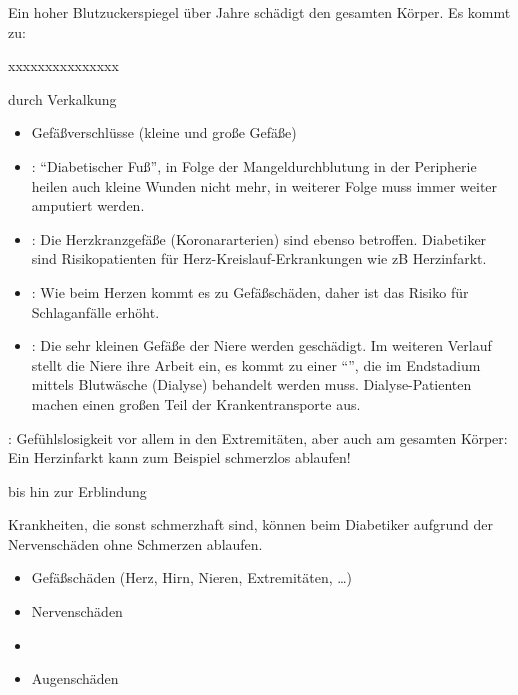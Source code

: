 {
Ein hoher Blutzuckerspiegel über Jahre schädigt den gesamten
Körper. Es kommt zu:
\begin{labeling}[~--]{xxxxxxxxxxxxxxx }
  \item[Gefäßschäden] durch Verkalkung
  \begin{itemize}
    \item Gefäßverschlüsse (kleine und große Gefäße)
    \item {}: "`Diabetischer
    Fuß"', in Folge der Mangeldurchblutung in der Peripherie heilen auch kleine
    Wunden nicht mehr, in weiterer Folge muss immer weiter amputiert
    werden.
    \item {}: Die Herzkranzgefäße
    (Koronar\-arterien) sind ebenso betroffen. Diabetiker sind Risikopatienten für
    Herz-Kreislauf-Erkrankungen wie zB Herz\-infarkt.
    \item {}: Wie beim Herzen kommt es zu
    Gefäßschäden, daher ist das Risiko für
    Schlaganfälle erhöht.
    \item {}: Die sehr kleinen Gefäße der
    Niere werden geschädigt. Im weiteren Verlauf stellt die Niere ihre
    Arbeit ein, es kommt zu einer "`"', die im Endstadium mittels
    Blutwäsche (Dialyse) behandelt werden muss. Dialyse-Patienten machen
    einen großen Teil der Krankentransporte aus.
  \end{itemize}
  \item [Nervenschäden] :
  Gefühlslosigkeit vor allem in den Extremitäten, aber auch am
  gesamten Körper: Ein Herzinfarkt kann zum Beispiel schmerzlos
  ablaufen!
  \item [Augenschäden] bis hin zur Erblindung
  
\end{labeling}

Krankheiten, die sonst schmerzhaft sind, können beim Diabetiker aufgrund
der Nervenschäden ohne Schmerzen ablaufen. 

}{
\begin{itemize}
  \item Gefäßschäden (Herz, Hirn, Nieren, Extremitäten, \ldots)
  \item Nervenschäden
  \item {}
  \item Augenschäden
\end{itemize}
}{}{}{}








